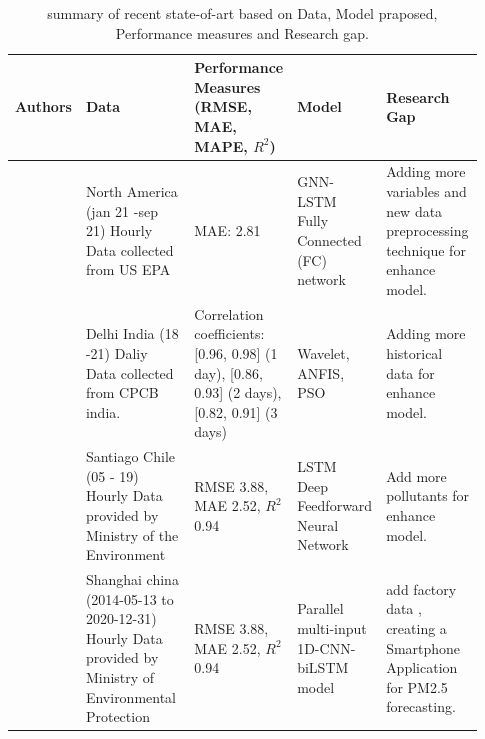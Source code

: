 \documentclass[a4paper, fleqn]{cas-sc}
\theoremstyle{definition}
\theoremstyle{remark}
\begin{document}
\begin{landscape}
  \setlength{\tabcolsep}{3pt}
  
  {\renewcommand{\arraystretch}{1}%
  \begin{longtable}[h!]{ p{0.12\linewidth} p{0.27\linewidth} p{0.16\linewidth} p{0.16\linewidth} p{0.22\linewidth} }%
  \caption{summary of recent state-of-art based on Data,  Model praposed,  Performance measures and Research gap.}
  \label{t_lr}\\
  \hline
  Authors                    & Data                                                                                                     & Performance Measures (RMSE,  MAE, MAPE,  $R^2$)                                                                    & Model                                                               & Research Gap                                                       \\ \hline
  \endhead
  \hline
  \endfoot
  \endlastfoot
  \cite{li2023nested}                & North America (jan 21 -sep 21)   Hourly Data collected from US EPA                                       & MAE:  2.81                                                                                               & GNN-LSTM Fully Connected (FC) network                              & Adding more variables and new data preprocessing technique for enhance model.                                    \\
  \cite{pruthi2022low}           & Delhi  India (18 -21) Daliy Data collected from   CPCB india.                                            & Correlation coefficients:  {[}0.96, 0.98{]} (1   day),  {[}0.86, 0.93{]} (2 days),  {[}0.82, 0.91{]} (3 days) & Wavelet,  ANFIS,  PSO                                                 &  Adding more historical data for enhance model.                                                  \\
  \cite{menares2021forecasting}             & Santiago Chile (05 - 19) Hourly   Data provided by Ministry of the Environment                           & RMSE 3.88,  MAE 2.52,  $R^2$ 0.94                                                                            & LSTM Deep Feedforward Neural Network                               & Add more pollutants for enhance model.               \\
 \cite{zhu2023investigation}            & Shanghai china (2014-05-13 to 2020-12-31)   Hourly Data provided by Ministry of Environmental Protection & RMSE 3.88,  MAE 2.52,  $R^2$ 0.94                                                                            & Parallel multi-input 1D-CNN-biLSTM   model                          & add  factory data ,  creating a Smartphone Application for PM2.5 forecasting.                                                         \\




\end{longtable}}
\end{landscape}
\end{document}
